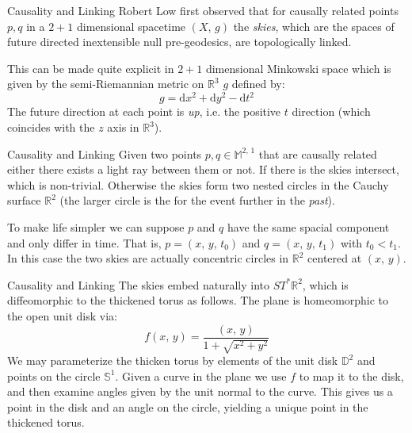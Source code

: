\documentclass{beamer}
\begin{document}
    \begin{frame}{Causality and Linking}
        Robert Low first observed that for causally related points $p,q$ in a
        $2+1$ dimensional spacetime $(X,\,g)$ the \textit{skies}, which are
        the spaces of future directed inextensible null pre-geodesics, are
        topologically linked.
        \par\hfill\par
        This can be made quite explicit in $2+1$ dimensional Minkowski space
        which is given by the semi-Riemannian metric on $\mathbb{R}^{3}$ $g$
        defined by:
        \begin{equation}
            g=\textrm{d}x^{2}+\textrm{d}y^{2}-\textrm{d}t^{2}
        \end{equation}
        The future direction at each point is \textit{up}, i.e. the positive
        $t$ direction (which coincides with the $z$ axis in $\mathbb{R}^{3}$).
    \end{frame}
    \begin{frame}{Causality and Linking}
        Given two points $p,q\in\mathbb{M}^{2,\,1}$ that are causally related
        either there exists a light ray between them or not. If there is the
        skies intersect, which is non-trivial. Otherwise the skies form two
        nested circles in the Cauchy surface $\mathbb{R}^{2}$ (the larger
        circle is the for the event further in the \textit{past}).
        \par\hfill\par
        To make life simpler we can suppose $p$ and $q$ have the same spacial
        component and only differ in time. That is, $p=(x,\,y,\,t_{0})$ and
        $q=(x,\,y,\,t_{1})$ with $t_{0}<t_{1}$. In this case the two skies are
        actually concentric circles in $\mathbb{R}^{2}$ centered at $(x,\,y)$.
    \end{frame}
    \begin{frame}{Causality and Linking}
        The skies embed naturally into $ST^{*}\mathbb{R}^{2}$, which is
        diffeomorphic to the thickened torus as follows. The plane is
        homeomorphic to the open unit disk via:
        \begin{equation}
            f(x,\,y)=\frac{(x,\,y)}{1+\sqrt{x^{2}+y^{2}}}
        \end{equation}
        We may parameterize the thicken torus by elements of the unit disk
        $\mathbb{D}^{2}$ and points on the circle $\mathbb{S}^{1}$. Given a
        curve in the plane we use $f$ to map it to the disk, and then examine
        angles given by the unit normal to the curve. This gives us a point in
        the disk and an angle on the circle, yielding a unique point in the
        thickened torus.
    \end{frame}
\end{document}

